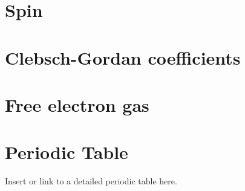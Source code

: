 \documentclass[12pt,a4paper]{article}
\begin{document}
\section*{Spin}

\section*{Clebsch-Gordan coefficients}

\section*{Free electron gas}


	
	
	\section*{Periodic Table}
	Insert or link to a detailed periodic table here.
	
\end{document}
